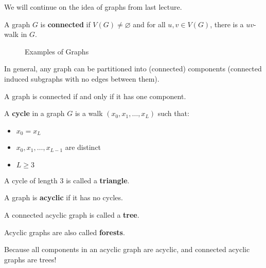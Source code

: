 \documentclass[a4paper]{article}
\begin{document}

We will continue on the idea of graphs from last lecture.
\begin{definition}
	A graph \( G \) is \textbf{connected} if \( V(G) \neq \varnothing \) and for all \( u,v\in V(G) \), there is a \( uv \)-walk in \( G \).
\end{definition}

\begin{figure}[ht]
    \centering
    \caption{Examples of Graphs}
    \label{fig:a-disconnected-graph}
\end{figure}

In general, any graph can be partitioned into (connected) components (connected induced subgraphs with no edges between them).

\begin{note}
	A graph is connected if and only if it has one component.
\end{note}

\begin{definition}
	A \textbf{cycle} in a graph \( G \) is a walk \( (x_{0}, x_{1},\ldots, x_{L}) \) such that:
	\begin{itemize}
		\item \( x_{0} = x_L \)
		\item \( x_{0}, x_{1}, \ldots, x_{L - 1} \) are distinct
		\item \( L \geq 3 \)
	\end{itemize}
\end{definition}

\begin{definition}
	A cycle of length 3 is called a \textbf{triangle}.
\end{definition}

\begin{definition}
	A graph is \textbf{acyclic} if it has no cycles.
\end{definition}

\begin{definition}
	A connected acyclic graph is called a \textbf{tree}.
\end{definition}

\begin{definition}
	Acyclic graphs are also called \textbf{forests}.
\end{definition}
\begin{remark}
	Because all components in an acyclic graph are acyclic, and connected acyclic graphs are trees!
\end{remark}
\end{document}
